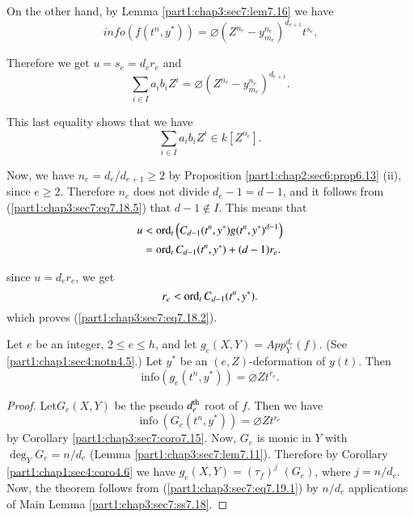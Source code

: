 On the other hand, by Lemma \ref{part1:chap3:sec7:lem7.16}  we have
$$
info (f(t^n, y^*)) = \diameter \left(Z^{n_e}- y^{n_e}_{m_e}\right)^{d_{e+1}} t^{s_e}. 
$$

Therefore we get $u= s_e = d_e r_e$ and 
$$
\sum_{i \in I} a_i b_i Z^i = \diameter \left(Z^{n_e}- y^{n_e}_{m_e} \right)^{d_{e+1}}.
$$

This last equality shows that we have
\begin{equation*}
  \sum_{i \in I } a_i b_i Z^i \in k [Z^{n_e}]. \tag{7.18.5} \label{part1:chap3:sec7:eq7.18.5} 
\end{equation*}

Now, we have $n_e = d_e / d_{e+1}\geq 2$ by Proposition \ref{part1:chap2:sec6:prop6.13} (ii), since $e \geq 2$. Therefore $n_e$ does not divide $d_e-1=d-1$, and it follows from (\ref{part1:chap3:sec7:eq7.18.5}) that $d- 1 \notin I$. This means that
\begin{align*}
  u & < \operatorname{ord}_t \left(C_{d-1} (t^n, y^*) g(t^n, y^*)^{d-1}\right)\\
  & = \operatorname{ord}_t C_{d-1} (t^n , y^*) + (d-1) r_e.
\end{align*}

since $u= d_e r_e$, we get
$$
r_e < \operatorname{ord}_t C_{d-1} (t^n, y^*).
$$
which proves (\ref{part1:chap3:sec7:eq7.18.2}).

\setcounter{thm}{18}
\begin{thm}\label{part1:chap3:sec7:thm7.19} 
  Let $e$ be an integer, $2 \leq e \leq h$, and let $g_e (X, Y)= App_Y^{d_e}(f)$. (See \ref{part1:chap1:sec4:notn4.5}.) Let $y^*$ be an $(e, Z)$-deformation of $y(t)$. Then
$$
\text{info} (g_e (t^n, y^*)) = \diameter Z t^{r_e}.
$$
\end{thm}

\begin{proof}
Let\pageoriginale $G_e(X, Y)$ be the pseudo $d_e^{\rm th}$ root of $f$. Then we have 
\begin{equation*}
  \text{info}~ (G_e (t^n, y^*)) = \diameter Z t^{r_e}\tag{7.19.1} \label{part1:chap3:sec7:eq7.19.1}
\end{equation*}
by Corollary \ref{part1:chap3:sec7:coro7.15}. Now, $G_e$ is monic in
$Y$ with $\deg_{Y}G_e= n/d_e$ (Lemma
\ref{part1:chap3:sec7:lem7.11}). Therefore by Corollary
\ref{part1:chap1:sec4:coro4.6} we have $g_e (X, Y)= (\tau_f)^j$ $(G_e)$,
where $j= n/d_e$. Now, the theorem follows from
(\ref{part1:chap3:sec7:eq7.19.1}) by $n/d_e$ applications of Main
Lemma \ref{part1:chap3:sec7:ss7.18}. 
\end{proof}

